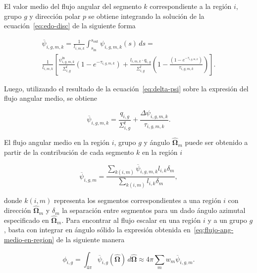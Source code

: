 \documentclass[11pt]{article}
\begin{document}
El valor medio del flujo angular del segmento $k$ correspondiente a la región $i$, grupo $g$ y dirección polar $p$ se obtiene integrando la soluci\'on de la ecuación~\eqref{eq:edo-disc} de la siguiente forma

\begin{multline}
 \overline{\psi}_{i,g,m,k} =
 \frac{1}{l_{i,m,k}} \int_{s_{\text{in}}}^{s_{\text{out}}} \psi_{i,g,m,k} (s) \, ds = \\
 \frac{1}{l_{i,m,k}} \left[ \frac{\psi^{\text{in}}_{i,g,m,k}}{\Sigma^t_{i,g}} \left(1 - e^{-\tau_{i,g,m,k}} \right) + \frac{l_{i,m,k} \cdot q_{i,g}}{\Sigma^t_{i,g}} \left( 1 - \frac{\left(1 - e^{-\tau_{i,g,m,k}} \right)}{\tau_{i,g,m,k}} \right) \right].
\end{multline}

\noindent
Luego, utilizando el resultado de la ecuación~\eqref{eq:delta-psi} sobre la expresi\'on del flujo angular medio, se obtiene

\begin{equation} \label{eq:flujo-ang-medio-en-segmento}
 \overline{\psi}_{i,g,m,k} = \frac{q_{i,g}}{\Sigma^t_{i,g}} + \frac{\Delta \psi_{i,g,m,k}}{\tau_{i,g,m,k}}.
\end{equation}

El flujo angular medio en la región $i$, grupo $g$ y ángulo $\boldsymbol{\hat{\Omega}}_m$ puede ser obtenido a partir de la contribuci\'on de cada segmento $k$ en la región $i$

\begin{equation} \label{eq:flujo-ang-medio-en-region}
 \overline{\psi}_{i,g,m} = \frac{\sum_{k(i,m)} \overline{\psi}_{i,g,m,k} l_{i,k} \delta_m}{\sum_{k(i,m)} l_{i,k} \delta_m},
\end{equation}

\noindent
donde $k(i,m)$ representa los segmentos correspondientes a una región $i$ con dirección $\boldsymbol{\hat{\Omega}}_m$ y $\delta_m$ la separaci\'on entre segmentos para un dado ángulo azimutal especificado en $\boldsymbol{\hat{\Omega}}_m$. Para encontrar al flujo escalar en una región $i$ y a un grupo $g$, basta con integrar en ángulo s\'olido la expresi\'on obtenida en~\eqref{eq:flujo-ang-medio-en-region} de la siguiente manera

\begin{equation} \label{eq:flujo-escalar-1}
 \phi_{i,g} = \int_{4\pi} \overline{\psi}_{i,g} (\boldsymbol{\hat{\Omega}}) \, d\boldsymbol{\hat{\Omega}} \approx 
 4\pi \sum_m w_m \overline{\psi}_{i,g,m}.
\end{equation}
\end{document}
